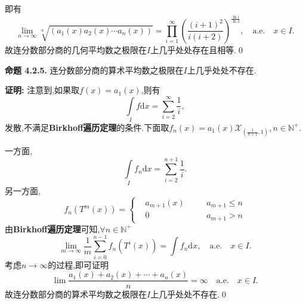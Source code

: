 即有
$$\lim\limits_{n\to\infty}\sqrt[n]{(a_1(x)a_2(x)\cdots a_n(x))}=\prod\limits_{i=1}^\infty\left(\frac{(i+1)^2}{i(i+2)}\right)^{\frac{\ln{i}}{\ln{2}}},\quad\mathrm{a.e.}\quad x\in I.$$
故连分数部分商的几何平均数之极限在$I$上几乎处处存在且相等.\qed
\par
\textbf{命题 4.2.5.  }\textsuperscript{\cite{Ergodic_theory}}
连分数部分商的算术平均数之极限在$I$上几乎处处不存在.
\par
\textbf{证明:  }
注意到,如果取$f(x)=a_1(x)$,则有
$$\int\limits_{I}f\mathrm{d}x=\sum_{i=2}^{\infty}\frac{1}{i},$$发散,不满足\textbf{Birkhoff遍历定理}的条件.下面取$f_n(x)=a_1(x)\mathcal{X}_{(\frac{1}{n+1},1)},n\in\mathbb{N^+}$.\par
一方面,
$$\int\limits_{I}f_n\mathrm{d}x=\sum_{i=2}^{n+1}\frac{1}{i}.$$
另一方面,
$$f_n(T^{m}(x))=\left\{
\begin{aligned}
&a_{m+1}(x) \quad &&a_{m+1}\leqslant n\\
&0\quad &&a_{m+1}> n
\end{aligned}
\right
.$$
由\textbf{Birkhoff遍历定理}可知,$\forall n\in\mathbb{N^+}$
$$\lim_{m\to\infty}\frac{1}{m}\sum\limits_{i=0}^{n-1}f_n(T^{i}(x))=\int f_n\mathrm{d}x,\quad \mathrm{a.e.}\quad x\in I.$$
考虑$n\to\infty$的过程,即可证明
$$\lim\frac{a_1(x)+a_2(x)+\cdots+a_n(x)}{n}=\infty\quad\mathrm{a.e.}\quad x\in I.$$
故连分数部分商的算术平均数之极限在$I$上几乎处处不存在.\qed
\par
\sectionbreak